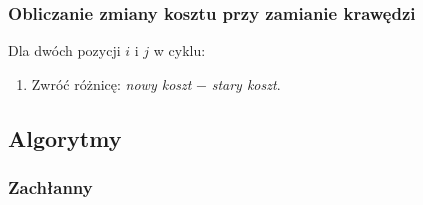 \documentclass[11pt]{article}
\begin{document}
\subsubsection{Obliczanie zmiany kosztu przy zamianie krawędzi}

Dla dwóch pozycji $i$ i $j$ w cyklu:
\begin{enumerate}
    \begin{enumerate}
        \item Wyznacz wierzchołki poprzedzające i następujące po $i$ i po $j$.
        \item Oblicz sumę długości krawędzi: przed zamianą $i$ i $j$.
        \begin{enumerate}
            \item długość $i-1 -> i$ + długość $j -> j+1$
        \end{enumerate}
        \item Oblicz sumę długości po zamianie krawędzi:
        \begin{enumerate}
            \item długość $i-1 -> j-1$ + długość $i -> j$
        \end{enumerate}
    \end{enumerate}
    \item Zwróć różnicę: \textit{nowy koszt} $-$ \textit{stary koszt}.
\end{enumerate}

\subsection{Algorytmy}

\subsubsection{Zachłanny}\label{subsec:zachanny}
\end{document}
